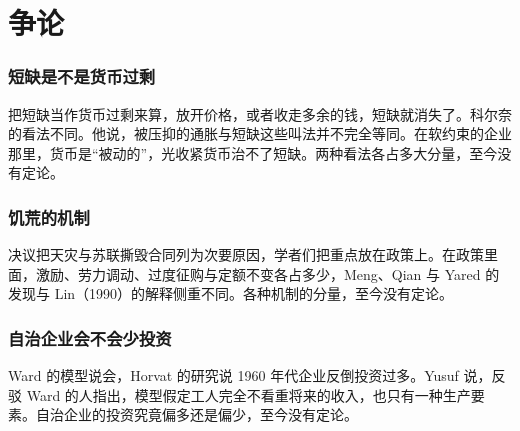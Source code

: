 \section{争论}\label{sec:planned-debate}

\subsubsection{短缺是不是货币过剩}

把短缺当作货币过剩来算，放开价格，或者收走多余的钱，短缺就消失了。科尔奈的看法不同。他说，被压抑的通胀与短缺这些叫法并不完全等同\cite{kornai1980}。在软约束的企业那里，货币是“被动的”，光收紧货币治不了短缺\cite{kornai1986}。两种看法各占多大分量，至今没有定论。

\subsubsection{饥荒的机制}

决议把天灾与苏联撕毁合同列为次要原因，学者们把重点放在政策上\cite{res1981,smil1999}。在政策里面，激励、劳力调动、过度征购与定额不变各占多少，Meng、Qian 与 Yared 的发现与 Lin（1990）的解释侧重不同\cite{mqy2010}。各种机制的分量，至今没有定论。

\subsubsection{自治企业会不会少投资}

Ward 的模型说会，Horvat 的研究说 1960 年代企业反倒投资过多\cite{yusuf1977}。Yusuf 说，反驳 Ward 的人指出，模型假定工人完全不看重将来的收入，也只有一种生产要素\cite{yusuf1977}。自治企业的投资究竟偏多还是偏少，至今没有定论。


